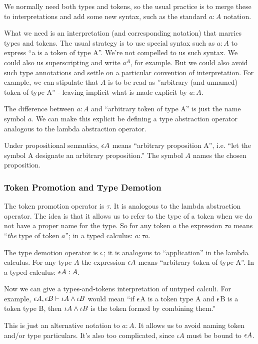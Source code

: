 \documentclass{article}
\begin{document}
We normally need both types and tokens, so the usual practice is to
merge these to interpretations and add some new syntax, such as the
standard \(a:A\) notation.

What we need is an interpretation (and corresponding notation) that
marries types and tokens. The usual strategy is to use special syntax
such as \(a:A\) to express ``a is a token of type A''. We're not
compelled to us such syntax. We could also us superscripting and write
\(a^A\), for example. But we could also avoid such type annotations
and settle on a particular convention of interpretation. For example,
we can stipulate that \(A\) is to be read as ''arbitrary (and unnamed)
token of type A'' - leaving implicit what is made explicit by \(a:A\).

The difference between \(a:A\) and ``arbitrary token of type A'' is
just the name symbol \(a\). We can make this explicit be defining a
type abstraction operator analogous to the lambda abstraction
operator.

Under propositional semantics, \(\epsilon A\) means ``arbitrary
proposition A'', i.e. ``let the symbol A designate an arbitrary
proposition.''  The symbol \(A\) names the chosen proposition.

\subsubsection{Token Promotion and Type Demotion}

The token promotion operator is \(\tau\).  It is analogous to the
lambda abstraction operator. The idea is that it allows us to refer
to the type of a token when we do not have a proper name for the type.
So for any token \(a\) the expression \(\tau a\) means ``\textit{the} type of
token \(a\)''; in a typed calculus: \(a: \tau a\).

The type demotion operator is \(\epsilon\); it is analogous to
``application'' in the lambda calculus. For any type \(A\) the
expression \(\epsilon A\) means ``arbitrary token of type A''. In a
typed calculus: \(\epsilon A: A\).

Now we can give a types-and-tokens interpretation of untyped calculi.
For example, \(\epsilon A, \epsilon B\vdash \iota A\land \iota B\) would
mean ``if \(\epsilon\)A is a token type A and \(\epsilon\)B is a token
type B, then \(\iota A \land\iota B\) is the token formed by
combining them.''

This is just an alternative notation to \(a:A\). It allows us to avoid
naming token and/or type particulars. It's also too complicated, since
\(\iota A\) must be bound to \(\epsilon A\).
\end{document}
